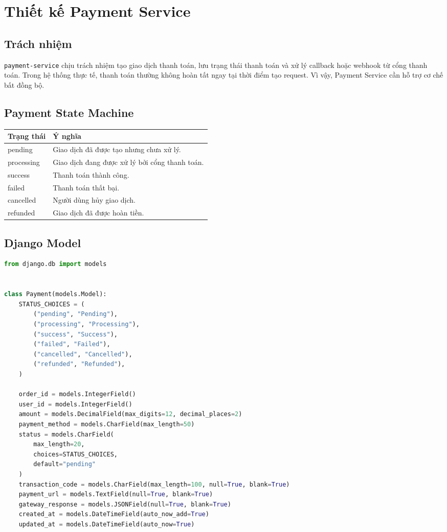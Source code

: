 \section{Thiết kế Payment Service}

\subsection{Trách nhiệm}

\texttt{payment-service} chịu trách nhiệm tạo giao dịch thanh toán, lưu trạng thái thanh toán và xử lý callback hoặc webhook từ cổng thanh toán. Trong hệ thống thực tế, thanh toán thường không hoàn tất ngay tại thời điểm tạo request. Vì vậy, Payment Service cần hỗ trợ cơ chế bất đồng bộ.

\subsection{Payment State Machine}

\begin{longtable}{|p{4cm}|p{9cm}|}
\hline
\textbf{Trạng thái} & \textbf{Ý nghĩa} \\
\hline
pending & Giao dịch đã được tạo nhưng chưa xử lý. \\
\hline
processing & Giao dịch đang được xử lý bởi cổng thanh toán. \\
\hline
success & Thanh toán thành công. \\
\hline
failed & Thanh toán thất bại. \\
\hline
cancelled & Người dùng hủy giao dịch. \\
\hline
refunded & Giao dịch đã được hoàn tiền. \\
\hline
\end{longtable}

\subsection{Django Model}

\begin{lstlisting}[style=code,language=Python]
from django.db import models


class Payment(models.Model):
    STATUS_CHOICES = (
        ("pending", "Pending"),
        ("processing", "Processing"),
        ("success", "Success"),
        ("failed", "Failed"),
        ("cancelled", "Cancelled"),
        ("refunded", "Refunded"),
    )

    order_id = models.IntegerField()
    user_id = models.IntegerField()
    amount = models.DecimalField(max_digits=12, decimal_places=2)
    payment_method = models.CharField(max_length=50)
    status = models.CharField(
        max_length=20,
        choices=STATUS_CHOICES,
        default="pending"
    )
    transaction_code = models.CharField(max_length=100, null=True, blank=True)
    payment_url = models.TextField(null=True, blank=True)
    gateway_response = models.JSONField(null=True, blank=True)
    created_at = models.DateTimeField(auto_now_add=True)
    updated_at = models.DateTimeField(auto_now=True)
\end{lstlisting}

